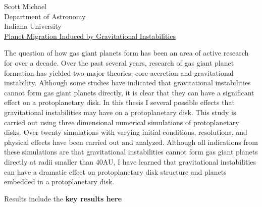 \documentclass[letterpaper,11pt]{article}
\begin{document}
\pagestyle{empty}
\begin{center}
Scott Michael \\
Department of Astronomy \\
Indiana University \\
\vspace{0.5in}\underline {Planet Migration Induced by Gravitational Instabilities}

\end{center}

The question of how gas giant planets form has been an area of active research for over a decade. Over the past several years, research of gas giant planet formation has yielded two major theories, core accretion and gravitational instability. Although some studies have indicated that gravitational instabilities cannot form gas giant planets directly, it is clear that they can have a significant effect on a protoplanetary disk. In this thesis I several possible effects that gravitational instabilities may have on a protoplanetary disk. This study is carried out using three dimensional numerical simulations of protoplanetary disks. Over twenty simulations with varying initial conditions, resolutions, and physical effects have been carried out and analyzed. Although all indications from these simulations are that gravitational instabilities cannot form gas giant planets directly at radii smaller than 40AU, I have learned that gravitational instabilities can have a dramatic effect on protoplanetary disk structure and planets embedded in a protoplanetary disk. 

Results include the {\bf key results here}

\vspace{0.5in}
\end{document}
